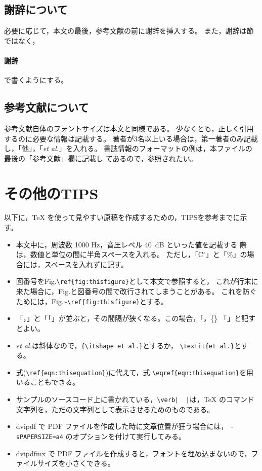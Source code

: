 \documentclass[10pt,twocolumn]{jarticle} %
\begin{document}
\subsection{謝辞について}

必要に応じて，本文の最後，参考文献の前に謝辞を挿入する。
また，謝辞は節ではなく，
\begin{verb}
\paragraph{謝辞}
\end{verb}
で書くようにする。

\subsection{参考文献について}

参考文献自体のフォントサイズは本文と同様である。
少なくとも，正しく引用するのに必要な情報は記載する。
著者が3名以上いる場合は，第一著者のみ記載し，「他」，「{\itshape et
al.}」を入れる。
書誌情報のフォーマットの例は，本ファイルの最後の「参考文献」欄に記載し
てあるので，参照されたい。

\section{その他のTIPS}

以下に，TeX を使って見やすい原稿を作成するための，TIPSを参考までに示す。
\begin{itemize}
\itemsep -5pt
\item 本文中に，周波数 1000 Hz，音圧レベル 40~dB といった値を記載する
際は，数値と単位の間に半角スペースを入れる。
ただし，{}「C$^\circ$」と「\%」の場合には，スペースを入れずに記す。
\item 図番号をFig.\verb|\ref{fig:thisfigure}|として本文で参照すると，
これが行末に来た場合に，Fig.と図番号の間で改行されてしまうことがある。
これを防ぐためには，Fig.\verb|~\ref{fig:thisfigure}|とする。
\item 「，」と「「」が並ぶと，その間隔が狭くなる。この場合，{}「，\{\}
「」と記すとよい。
\item \textit{et al.}は斜体なので，\verb|{\itshape et al.}|とするか，
\verb|\textit{et al.}|とする。
\item 式(\verb|\ref{eqn:thisequation}|)に代えて，式
\verb|\eqref{eqn:thisequation}|を用いることもできる。
\item サンプルのソースコード上に書かれている，\verb,\verb|  |,は，TeX
のコマンド文字列を，ただの文字列として表示させるためのものである。
\item dvipdf で PDF ファイルを作成した時に文章位置が狂う場合には，
{\tt -sPAPERSIZE=a4} のオプションを付けて実行してみる。
\item dvipdfmx で PDF ファイルを作成すると，フォントを埋め込まないので，ファイルサイズを小さくできる。
\end{itemize}
\end{document}
